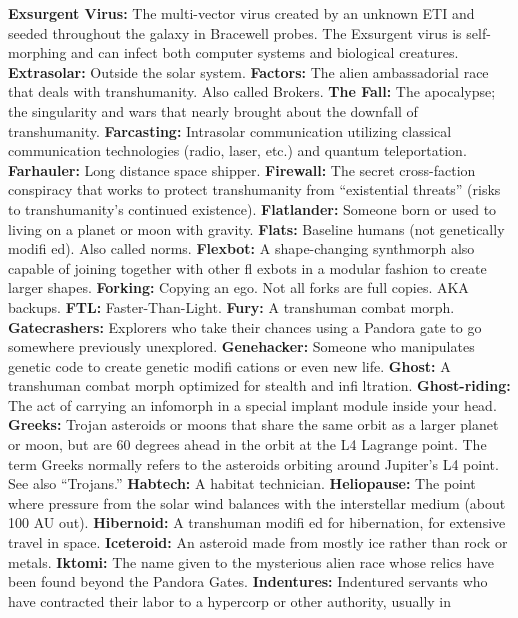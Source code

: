 \textbf{ Exsurgent Virus:} The multi-vector virus created by 
an unknown ETI and seeded throughout the galaxy in 
Bracewell probes. The Exsurgent virus is self-morphing and 
can infect both computer systems and biological creatures.
\textbf{ Extrasolar:} Outside the solar system.
\textbf{ Factors:} The alien ambassadorial race that deals with 
transhumanity. Also called Brokers.
\textbf{ The Fall:} The apocalypse; the singularity and wars that 
nearly brought about the downfall of transhumanity.
\textbf{ Farcasting:} Intrasolar communication utilizing classical 
communication technologies (radio, laser, etc.) and 
quantum teleportation.
\textbf{ Farhauler:} Long distance space shipper.
\textbf{ Firewall:} The secret cross-faction conspiracy that works 
to protect transhumanity from ``existential threats'' (risks 
to transhumanity's continued existence).
\textbf{ Flatlander:} Someone born or used to living on a planet 
or moon with gravity.
\textbf{ Flats:} Baseline humans (not genetically modiﬁ ed). Also 
called norms.
\textbf{ Flexbot:} A shape-changing synthmorph also capable of 
joining together with other ﬂ exbots in a modular fashion 
to create larger shapes.
\textbf{ Forking:} Copying an ego. Not all forks are full copies. 
AKA backups.
\textbf{ FTL:} Faster-Than-Light.
\textbf{ Fury:} A transhuman combat morph.
\textbf{ Gatecrashers:} Explorers who take their chances using a 
Pandora gate to go somewhere previously unexplored.
\textbf{ Genehacker:} Someone who manipulates genetic code to 
create genetic modiﬁ cations or even new life.
\textbf{ Ghost:} A transhuman combat morph optimized for 
stealth and inﬁ ltration.
\textbf{ Ghost-riding:} The act of carrying an infomorph in a 
special implant module inside your head.
\textbf{ Greeks:} Trojan asteroids or moons that share the same 
orbit as a larger planet or moon, but are 60 degrees 
ahead in the orbit at the L4 Lagrange point. The term 
Greeks normally refers to the asteroids orbiting around 
Jupiter's L4 point. See also ``Trojans.''
\textbf{ Habtech:} A habitat technician.
\textbf{ Heliopause:} The point where pressure from the solar wind 
balances with the interstellar medium (about 100 AU out).
\textbf{ Hibernoid:} A transhuman modiﬁ ed for hibernation, for 
extensive travel in space.
\textbf{ Iceteroid:} An asteroid made from mostly ice rather than 
rock or metals.
\textbf{ Iktomi:} The name given to the mysterious alien race 
whose relics have been found beyond the Pandora Gates.
\textbf{ Indentures:} Indentured servants who have contracted 
their labor to a hypercorp or other authority, usually in 
